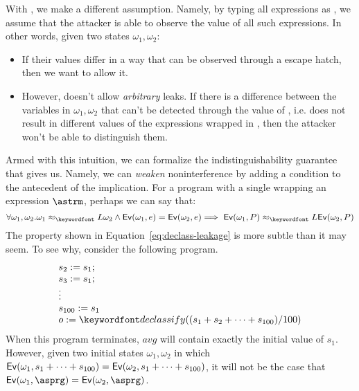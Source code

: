 \documentclass[11pt,twoside]{scrartcl}
\begin{document}
With , we make a different assumption. Namely, by typing all  expressions as \lowsec, we assume that the attacker is able to observe the value of all such expressions. In other words, given two states $\omega_1, \omega_2$:
\begin{itemize} 
\item If their values differ in a way that can be observed through a  escape hatch, then we want to allow it.
\item However,  doesn't allow \emph{arbitrary} leaks. If there is a difference between the \hisec variables in $\omega_1,\omega_2$ that can't be detected through the value of , i.e. does not result in different values of the expressions wrapped in , then the attacker won't be able to distinguish them.
\end{itemize}
Armed with this intuition, we can formalize the indistinguishability guarantee that  gives us. Namely, we can \emph{weaken} noninterference by adding a condition to the antecedent of the implication. For a program with a single  wrapping an expression $\astrm$, perhaps we can say that:
\begin{equation}
\label{eq:declass-leakage}
\forall \omega_1, \omega_2 . \omega_1 \approx_\lowsec \omega_2 \land \eval{\omega_1}{e} = \eval{\omega_2}{e} \Longrightarrow\ \eval{\omega_1}{P} \approx_\lowsec \eval{\omega_2}{P}
\end{equation}
The property shown in Equation~\ref{eq:declass-leakage} is more subtle than it may seem. To see why, consider the following program.
\begin{equation}
\begin{array}{l}
s_2 := s_1; \\
s_3 := s_1; \\
\vdots \\
s_{100} := s_1 \\
o := \pdeclass{(s_1 + s_2 + \cdots + s_{100})/100}
\end{array}
\end{equation}
When this program terminates, $\mathit{avg}$ will contain exactly the initial value of $s_1$. However, given two initial states $\omega_1, \omega_2$ in which $\mathsf{Ev}(\omega_1,s_1 + \cdots + s_{100}) = \mathsf{Ev}(\omega_2,s_1 + \cdots + s_{100})$, it will not be the case that $\eval{\omega_1}{\asprg} = \eval{\omega_2}{\asprg}$.
\end{document}
